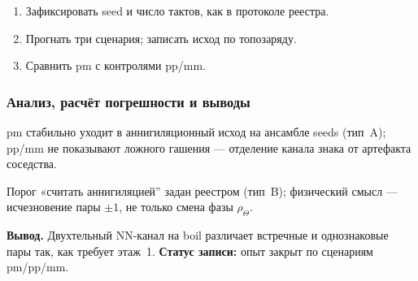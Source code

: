 \begin{enumerate}[label=\textbf{Шаг \arabic*:},leftmargin=*,itemsep=0.35em]
\item Зафиксировать seed и число тактов, как в протоколе реестра.
\item Прогнать три сценария; записать исход по топозаряду.
\item Сравнить pm с контролями pp/mm.
\end{enumerate}

\subsubsection*{Анализ, расчёт погрешности и выводы}
pm стабильно уходит в аннигиляционный исход на ансамбле seeds (тип~A); pp/mm не показывают ложного гашения --- отделение канала знака от артефакта соседства.

Порог «считать аннигиляцией'' задан реестром (тип~B); физический смысл --- исчезновение пары $\pm1$, не только смена фазы $\rho_\Theta$.

\textbf{Вывод.}
Двухтельный NN-канал на boil различает встречные и однознаковые пары так, как требует этаж~1.
\textbf{Статус записи:} опыт закрыт по сценариям pm/pp/mm.

